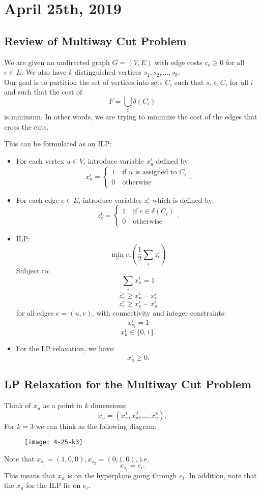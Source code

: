 \documentclass[../main/main.tex]{subfiles}
\begin{document}
\section{April 25th, 2019}
\subsection{Review of Multiway Cut Problem}
We are given an undirected graph $G=(V,E)$ with edge costs $c_e\ge 0$ for all $e\in E$. We also have $k$ distinguished vertices $s_1, s_2, \ldots,s_k$. \\

Our goal is to partition the set of vertices into sets $C_i$ such that $s_i \in  C_i$ for all $i$ and such that the cost of  \[
	F=\bigcup\limits_{i} \delta(C_i)
\] is minimum. In other words, we are trying to minimize the cost of the edges that cross the cuts.

This can be formulated as an ILP: 
\begin{itemize}
	\item For each vertex $u\in V$, introduce variable $x_u^i$ defined by: \[
	x^i_u=\begin{cases}
		1\quad\text{if $u$ is assigned to $C_i$}\\
		0\quad\text{otherwise}
	\end{cases}
	.\] 
\item For each edge $e\in E$, introduce variables $z_e^i$ which is defined by: \[
z_e^i=\begin{cases}
	1\quad\text{if $e\in \delta(C_i)$}\\
	0\quad\text{otherwise}
\end{cases}
.\] 
\item ILP: \[
		\min_e c_e\left( \frac{1}{2}\sum_i z_e^i \right) 
\] Subject to: \[
\sum_i x^i_u = 1
\] \[
z^i_e \ge x^i_u-x^i_v
\] \[
z^i_e\ge x^i_v - x^i_u
\] for all edges $e=(u,v)$, with connectivity and integer constraints: \[
x^i_{s_i}=1
\] \[
x^i_u \in \{0,1\} 
.\] 
\item For the LP relaxation, we have: \[
x_u^i \ge 0
.\] 
\end{itemize}
\subsection{LP Relaxation for the Multiway Cut Problem}
Think of $x_u$ as a point in $ k$ dimensions: \[
	x_u=(x_u^1, x_u^2,\ldots,x_u^k)
.\] For $k=3$ we can think as the following diagram:
\begin{figure}[h!]
	\centering
	\texttt{[image: 4-25-k3]}
	\label{fig:4-25-k3}
\end{figure}
\begin{remark}
Note that $x_{s_1}=(1,0,0), x_{s_2}=(0,1,0)$, i.e. \[
	x_{s_i}=e_i
.\] This means that $x_u$ is on the hyperplane going through $e_i$. In addition, note that the $x_u$ for the ILP lie on $e_i$.
\end{remark}
\end{document}
